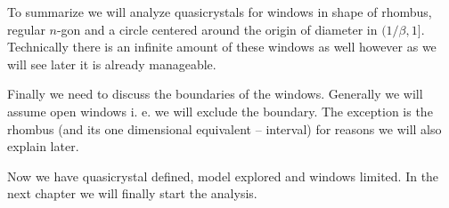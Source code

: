 \documentclass[text.tex]{subfiles}
\begin{document}
To summarize we will analyze quasicrystals for windows in shape of rhombus, regular $n$-gon and a circle centered around the origin of diameter in $(1/\beta,1]$. Technically there is an infinite amount of these windows as well however as we will see later it is already manageable. 

Finally we need to discuss the boundaries of the windows. Generally we will assume open windows i. e. we will exclude the boundary. The exception is the rhombus (and its one dimensional equivalent -- interval) for reasons we will also explain later. 

Now we have quasicrystal defined, model explored and windows limited. In the next chapter we will finally start the analysis. 
\end{document}
